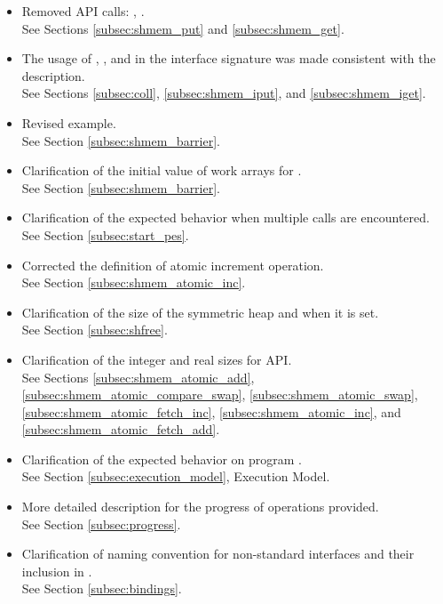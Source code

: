 \begin{itemize}
%
\item Removed \ac{API} calls: ,
      .
\\See Sections \ref{subsec:shmem_put} and \ref{subsec:shmem_get}. 
%
\item The usage of , , and  in the
      interface signature was made consistent with the description.
\\See Sections \ref{subsec:coll}, \ref{subsec:shmem_iput}, and \ref{subsec:shmem_iget}.
%
\item Revised  example.
\\See Section \ref{subsec:shmem_barrier}. 
%
\item Clarification of the initial value of  work arrays for
.\\ See Section \ref{subsec:shmem_barrier}. 
%
\item Clarification of the expected behavior when multiple 
calls are encountered.
\\See Section \ref{subsec:start_pes}.
%
\item Corrected the definition of atomic increment operation.
\\See Section \ref{subsec:shmem_atomic_inc}.
%
\item Clarification of the size of the symmetric heap and when it is set.
\\See Section \ref{subsec:shfree}.
%
\item Clarification of the integer and real sizes for \Fortran \ac{API}.
\\See Sections \ref{subsec:shmem_atomic_add},
      \ref{subsec:shmem_atomic_compare_swap},
      \ref{subsec:shmem_atomic_swap},
      \ref{subsec:shmem_atomic_fetch_inc},
      \ref{subsec:shmem_atomic_inc}, and
      \ref{subsec:shmem_atomic_fetch_add}.
%
\item Clarification of the expected behavior on program .
\\See Section \ref{subsec:execution_model}, Execution Model. 
%
\item More detailed description for the progress of \openshmem operations
provided.
\\See Section \ref{subsec:progress}. 
%
\item Clarification of naming convention for non-standard interfaces and their
inclusion in .
\\See Section \ref{subsec:bindings}. 

\end{itemize}
